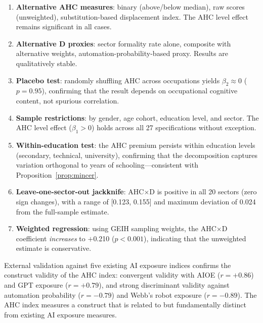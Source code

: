 \documentclass[11pt,a4paper]{article}
\theoremstyle{definition}
\begin{document}
\begin{enumerate}[leftmargin=*]
\item \textbf{Alternative AHC measures}: binary (above/below median), raw scores (unweighted), substitution-based displacement index. The AHC level effect remains significant in all cases.

\item \textbf{Alternative D proxies}: sector formality rate alone, composite with alternative weights, automation-probability-based proxy. Results are qualitatively stable.

\item \textbf{Placebo test}: randomly shuffling AHC across occupations yields $\beta_2 \approx 0$ ($p = 0.95$), confirming that the result depends on occupational cognitive content, not spurious correlation.

\item \textbf{Sample restrictions}: by gender, age cohort, education level, and sector. The AHC level effect ($\beta_1 > 0$) holds across all 27 specifications without exception.

\item \textbf{Within-education test}: the AHC premium persists within education levels (secondary, technical, university), confirming that the decomposition captures variation orthogonal to years of schooling---consistent with Proposition~\ref{prop:mincer}.

\item \textbf{Leave-one-sector-out jackknife}: AHC$\times$D is positive in all 20 sectors (zero sign changes), with a range of [0.123, 0.155] and maximum deviation of 0.024 from the full-sample estimate.

\item \textbf{Weighted regression}: using GEIH sampling weights, the AHC$\times$D coefficient \textit{increases} to $+$0.210 ($p < 0.001$), indicating that the unweighted estimate is conservative.
\end{enumerate}

External validation against five existing AI exposure indices confirms the construct validity of the AHC index: convergent validity with \citet{felten2021occupational} AIOE ($r = +0.86$) and \citet{eloundou2024gpts} GPT exposure ($r = +0.79$), and strong discriminant validity against \citet{frey2017future} automation probability ($r = -0.79$) and Webb's robot exposure ($r = -0.89$). The AHC index measures a construct that is related to but fundamentally distinct from existing AI exposure measures.
\end{document}
